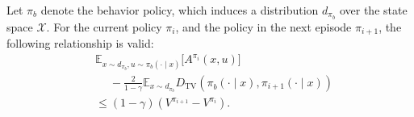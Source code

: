 \begin{corollary}
\label{corollary1}
Let \(\pi_b\) denote the behavior policy, which induces a distribution \(d_{\pi_b}\) over the state space \(\mathcal{X}\). For the current policy $\pi_i$, and the policy in the next episode $\pi_{i+1}$, the following relationship is valid:
\begin{equation} 
\label{eq-corollary1}
\begin{aligned}
& \mathbb{E}_{x \sim d_{\pi_b}, u \sim \pi_b(\cdot \mid x)} \bigg[ A^{\pi_i}(x, u) \bigg] \\
& \quad\; -\frac{2}{1-\gamma} \mathbb{E}_{x \sim d_{\pi_b}} D_{\mathrm{TV}}\left(\pi_b^{}(\cdot \mid x), \pi_{i+1}(\cdot \mid x)\right) \\
& \leq (1-\gamma)\left(V^{\pi_{i+1}}-V^{\pi_i}\right).
\end{aligned}
\end{equation}
\end{corollary}


